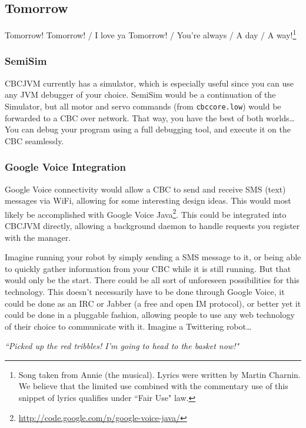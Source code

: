 \documentclass[12pt,letterpaper]{article}
\newcommand{\urlfootnote}[1]{\footnote{\url{#1}}}
\begin{document}
\subsection{Tomorrow}

Tomorrow! Tomorrow! / I love ya Tomorrow! / You're always / A day / A way!\footnote{Song taken from Annie (the musical). Lyrics were written by Martin Charnin. We believe that the limited use combined with the commentary use of this snippet of lyrics qualifies under ``Fair Use" law.}

\subsubsection{SemiSim}

CBCJVM currently has a simulator, which is especially useful since you can use any JVM debugger of your choice. SemiSim would be a continuation of the Simulator, but all motor and servo commands (from \texttt{cbccore.low}) would be forwarded to a CBC over network. That way, you have the best of both worlds\ldots You can debug your program using a full debugging tool, and execute it on the CBC seamlessly.



\subsubsection{Google Voice Integration}

Google Voice connectivity would allow a CBC to send and receive SMS (text) messages via WiFi, allowing for some interesting design ideas. This would most likely be accomplished with Google Voice Java\urlfootnote{http://code.google.com/p/google-voice-java/}. This could be integrated into CBCJVM directly, allowing a background daemon to handle requests you register with the manager.

Imagine running your robot by simply sending a SMS message to it, or being able to quickly gather information from your CBC while it is still running. But that would only be the start. There could be all sort of unforeseen possibilities for this technology. This doesn't necessarily have to be done through Google Voice, it could be done as an IRC or Jabber (a free and open IM protocol), or better yet it could be done in a pluggable fashion, allowing people to use any web technology of their choice to communicate with it. Imagine a Twittering robot\ldots

\textit{``Picked up the red tribbles! I'm going to head to the basket now!"}
\end{document}
